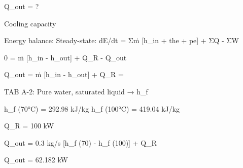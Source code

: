 Q_out = ?  

Cooling capacity  

Energy balance:  
Steady-state:  
dE/dt = Σṁ [h_in + the + pe] + ΣQ - ΣW  

0 = ṁ [h_in - h_out] + Q_R - Q_out  

Q_out = ṁ [h_in - h_out] + Q_R =  

TAB A-2:  
Pure water, saturated liquid → h_f  

h_f (70°C) = 292.98 kJ/kg  
h_f (100°C) = 419.04 kJ/kg  

Q_R = 100 kW  

Q_out = 0.3 kg/s [h_f (70) - h_f (100)] + Q_R  

Q_out = 62.182 kW